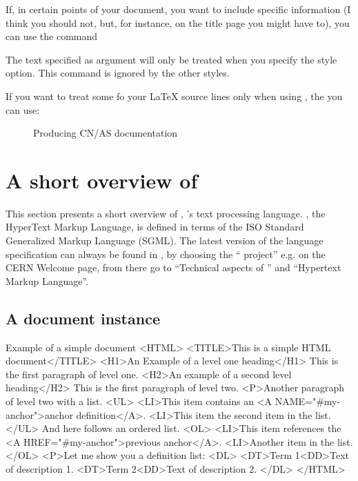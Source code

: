 If, in certain points of your document, you want to include 
\Html{} specific information (I think you should not, but, for instance,
on the title page you might have to), you can use the
command 


The text specified as argument will only be treated when
you specify the  style option.
This command is ignored by the other styles.

If you want to treat some fo your \LaTeX{} source lines only 
when  using \Html, the you can use:


\begin{figure}[p]
\begin{sideways}
\begin{minipage}[b]{\textheight}
\begin{center}
\end{center}
\caption{Producing CN/AS documentation}
\label{fig:cernmanscheme}
\end{minipage}
\end{sideways}
\end{figure}

\clearpage

\section{A short overview of \protect\Html}

This section presents a short overview of \Html{}, \WWW's 
text processing language. 
\Html{}, the HyperText Markup Language,
 is defined in terms of the ISO Standard Generalized 
Markup Language (SGML). 
The latest version of the \Html{} language specification
can always be found in \WWW{}, by choosing the ``\WWW{} project''
e.g. on the CERN Welcome page, from there go to 
``Technical aspects of \WWW'' and ``Hypertext Markup Language''.

\subsection{A \protect\Html{} document instance}

\begin{XMPt}{Example of a simple \Html{} document}
<HTML>
<TITLE>This is a simple HTML document</TITLE>
<H1>An Example of a level one heading</H1>
This is the first paragraph of level one.
<H2>An example of a second level heading</H2>
This is the first paragraph of level two.
<P>Another paragraph of level two with a list.
<UL>
<LI>This item contains an <A 
    NAME="#my-anchor">anchor definition</A>.
<LI>This item the second item in the list.
</UL>
And here follows an ordered list.
<OL>
<LI>This item references the <A
    HREF="#my-anchor">previous anchor</A>.
<LI>Another item in the list.
</OL>
<P>Let me show you a definition list:
<DL>
<DT>Term 1<DD>Text of description 1.
<DT>Term 2<DD>Text of description 2.
</DL>
</HTML>
\end{XMPt}

